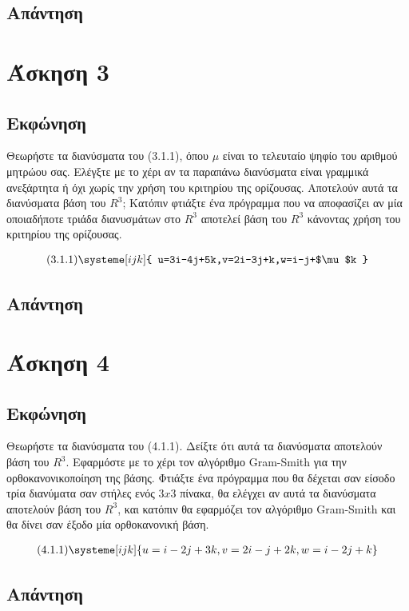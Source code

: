\documentclass[a4paper,14pt]{extreport}
\begin{document}
\newpage
\section{Απάντηση}

\chapter{Άσκηση 3}
\section{Εκφώνηση}

Θεωρήστε τα διανύσματα του (3.1.1), όπου $\mu$ είναι το τελευταίο ψηφίο του αριθμού μητρώου σας. Ελέγξτε με το χέρι αν τα παραπάνω διανύσματα είναι γραμμικά ανεξάρτητα ή όχι χωρίς την χρήση του κριτηρίου της ορίζουσας. Αποτελούν αυτά τα διανύσματα βάση του $R^{3}$; Κατόπιν φτιάξτε ένα πρόγραμμα που να αποφασίζει αν μία οποιαδήποτε τριάδα διανυσμάτων στο $R^{3}$ αποτελεί βάση του $R^{3}$ κάνοντας χρήση του κριτηρίου της ορίζουσας.

\begin{align*}
    \text{(3.1.1)}\systeme[ijk]{
        u=3i-4j+5k,v=2i-3j+k,w=i-j+$\mu$k
    }
\end{align*}

\newpage
\section{Απάντηση}

\chapter{Άσκηση 4}
\section{Εκφώνηση}

Θεωρήστε τα διανύσματα του (4.1.1). Δείξτε ότι αυτά τα διανύσματα αποτελούν βάση του $R^{3}$. Εφαρμόστε με το χέρι τον αλγόριθμο Gram-Smith για την ορθοκανονικοποίηση της βάσης. Φτιάξτε ένα πρόγραμμα που θα δέχεται σαν είσοδο τρία διανύματα σαν στήλες ενός $3x3$ πίνακα, θα ελέγχει αν αυτά τα διανύσματα αποτελούν βάση του $R^{3}$, και κατόπιν θα εφαρμόζει τον αλγόριθμο Gram-Smith και θα δίνει σαν έξοδο μία ορθοκανονική βάση.

\begin{align*}
    \text{(4.1.1)}\systeme[ijk]{
        u=i-2j+3k,v=2i-j+2k,w=i-2j+k
    }
\end{align*}


\newpage
\section{Απάντηση}
\end{document}

